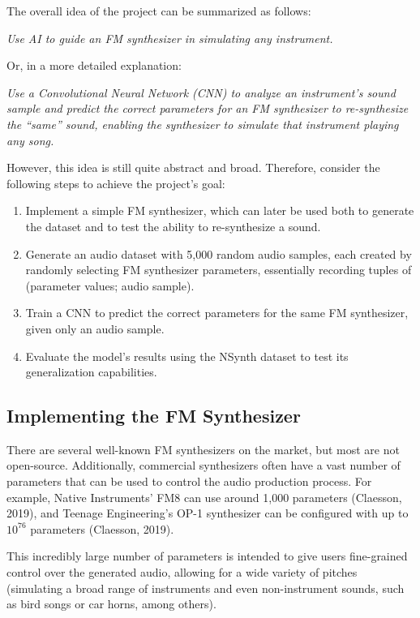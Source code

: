 \documentclass[sigconf,natbib=false]{acmart}
\begin{document}
The overall idea of the project can be summarized as follows:

\textit{Use AI to guide an FM synthesizer in simulating any instrument.}

Or, in a more detailed explanation:

\textit{Use a Convolutional Neural Network (CNN) to analyze an instrument's sound sample and predict the correct parameters for an FM synthesizer to re-synthesize the ``same'' sound, enabling the synthesizer to simulate that instrument playing any song.}

However, this idea is still quite abstract and broad. Therefore, consider the following steps to achieve the project's goal:

\begin{enumerate}
\item Implement a simple FM synthesizer, which can later be used both to generate the dataset and to test the ability to re-synthesize a sound.
\item Generate an audio dataset with 5,000 random audio samples, each created by randomly selecting FM synthesizer parameters, essentially recording tuples of (parameter values; audio sample).
\item Train a CNN to predict the correct parameters for the same FM synthesizer, given only an audio sample.
\item Evaluate the model's results using the NSynth dataset to test its generalization capabilities.
\end{enumerate}

\subsection{Implementing the FM Synthesizer}

There are several well-known FM synthesizers on the market, but most are not open-source. Additionally, commercial synthesizers often have a vast number of parameters that can be used to control the audio production process. For example, Native Instruments' FM8 can use around 1,000 parameters (Claesson, 2019), and Teenage Engineering’s OP-1 synthesizer can be configured with up to $10^{76}$ parameters (Claesson, 2019).

This incredibly large number of parameters is intended to give users fine-grained control over the generated audio, allowing for a wide variety of pitches (simulating a broad range of instruments and even non-instrument sounds, such as bird songs or car horns, among others).
\end{document}
